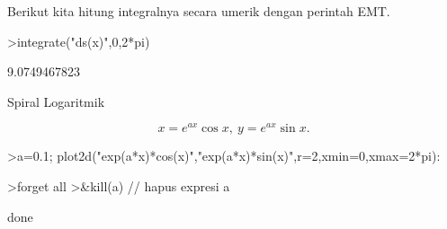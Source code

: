 \documentclass[a4paper,10pt]{article}
\begin{document}
\begin{eulernotebook}
\begin{eulercomment}
\begin{eulercomment}
\begin{eulercomment}
\begin{eulercomment}
\begin{eulercomment}
Berikut kita hitung integralnya secara umerik dengan perintah EMT.
\end{eulercomment}
\begin{eulerprompt}
>integrate("ds(x)",0,2*pi)
\end{eulerprompt}
\begin{euleroutput}
  9.0749467823
\end{euleroutput}
\begin{eulercomment}
Spiral Logaritmik

\end{eulercomment}
\begin{eulerformula}
\[
x=e^{ax}\cos x,\ y=e^{ax}\sin x.
\]
\end{eulerformula}
\begin{eulerprompt}
>a=0.1; plot2d("exp(a*x)*cos(x)","exp(a*x)*sin(x)",r=2,xmin=0,xmax=2*pi):
\end{eulerprompt}
\begin{eulerprompt}
>forget all
>&kill(a) // hapus expresi a
\end{eulerprompt}
\begin{euleroutput}
  
                                   done
  

\end{euleroutput}
\end{eulercomment}
\end{eulercomment}
\end{eulercomment}
\end{eulercomment}
\end{eulernotebook}
\end{document}
